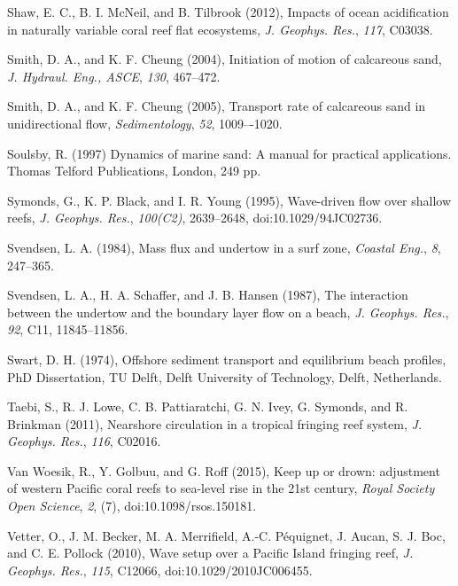\documentclass[default,jgrga]{agutex2015}
\begin{document}
\begin{article}
\begin{thebibliography}{}
Shaw, E. C., B. I. McNeil, and B. Tilbrook (2012), Impacts of ocean acidification in naturally variable coral reef flat ecosystems, \textit{J. Geophys. Res.}, \textit{117}, C03038.

Smith, D. A., and K. F. Cheung (2004), Initiation of motion of calcareous sand, \textit{J. Hydraul. Eng., ASCE}, \textit{130}, 467--472.

Smith, D. A., and K. F. Cheung (2005), Transport rate of calcareous sand in unidirectional flow, \textit{Sedimentology}, \textit{52}, 1009–-1020.

Soulsby, R. (1997) Dynamics of marine sand: A manual for practical applications. Thomas Telford Publications, London, 249 pp.

Symonds, G., K. P. Black, and I. R. Young (1995), Wave-driven flow over shallow reefs, \textit{J. Geophys. Res.}, \textit{100(C2)}, 2639--2648, doi:10.1029/94JC02736.

Svendsen, L. A. (1984), Mass flux and undertow in a surf zone, \textit{Coastal Eng.}, \textit{8}, 247--365.

Svendsen, L. A., H. A. Schaffer, and J. B. Hansen (1987), The interaction between the undertow and the boundary layer flow on a beach, \textit{J. Geophys. Res.}, \textit{92}, C11, 11845--11856.

Swart, D. H. (1974), Offshore sediment transport and equilibrium beach profiles, PhD Dissertation, TU Delft, Delft University of Technology, Delft, Netherlands.

Taebi, S., R. J. Lowe, C. B. Pattiaratchi, G. N. Ivey,  G. Symonds, and R. Brinkman (2011), Nearshore circulation in a
tropical fringing reef system, \textit{J. Geophys. Res.}, \textit{116}, C02016.

Van Woesik, R., Y. Golbuu, and G. Roff (2015), Keep up or drown: adjustment of western Pacific coral reefs to sea-level rise in the 21st century, \textit{Royal Society Open Science}, \textit{2}, (7), doi:10.1098/rsos.150181.

Vetter, O., J. M. Becker, M. A. Merrifield, A.-C. P\'equignet, J. Aucan, S. J. Boc, and C. E. Pollock (2010), Wave setup over a Pacific Island fringing reef, \textit{J. Geophys. Res.}, \textit{115}, C12066, doi:10.1029/2010JC006455.


\end{thebibliography}
\end{article}
\end{document}
